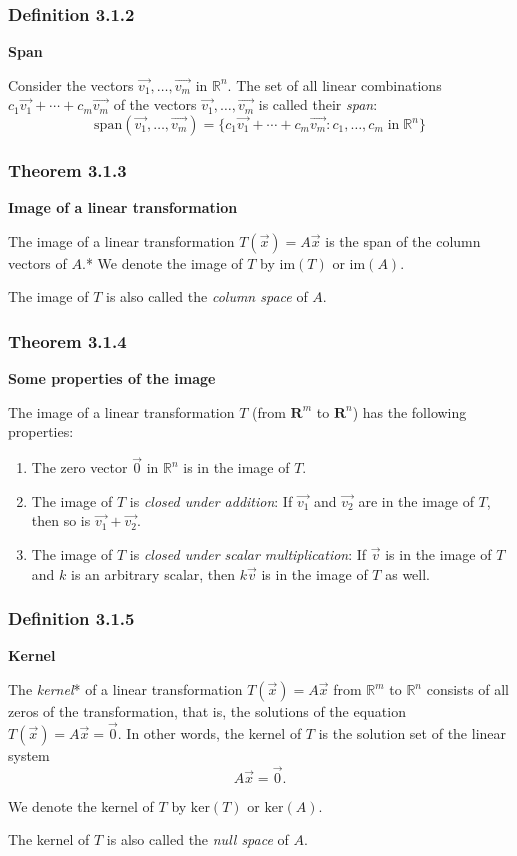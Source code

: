 \documentclass{report}
\begin{document}
\subsubsection*{Definition 3.1.2}
\par\noindent\textbf{Span}
\par\noindent Consider the vectors $\vec{v_{1}},\ldots{},\vec{v_{m}}$ in $\mathbb{R}^{n}$. The set of all linear combinations $c_{1}\vec{v_{1}}+\cdots{}+c_{m}\vec{v_{m}}$ of the vectors $\vec{v_{1}},\ldots{},\vec{v_{m}}$ is called their \textit{span}:
\[\textrm{span}(\vec{v_{1}},\ldots{},\vec{v_{m}})=\{c_{1}\vec{v_{1}}+\cdots{}+c_{m}\vec{v_{m}}:c_{1},\ldots{},c_{m}\;\textrm{in}\;\mathbb{R}^{n}\}\]
\subsubsection*{Theorem 3.1.3}
\par\noindent\textbf{Image of a linear transformation}
\par\noindent The image of a linear transformation $T(\vec{x})=A\vec{x}$ is the span of the column vectors of $A$.* We denote the image of $T$ by $\textrm{im}(T)$ or $\textrm{im}(A)$.
\par\noindent *The image of $T$ is also called the \textit{column space} of $A$.
\subsubsection*{Theorem 3.1.4}
\par\noindent\textbf{Some properties of the image}
\par\noindent The image of a linear transformation $T$ (from $\textbf{R}^{m}$ to $\textbf{R}^{n}$) has the following properties:
\renewcommand{\labelenumi}{\textbf{\alph{enumi}.}}
\begin{enumerate}
\item The zero vector $\vec{0}$ in $\mathbb{R}^{n}$ is in the image of $T$.
\item The image of $T$ is \textit{closed under addition}: If $\vec{v_{1}}$ and $\vec{v_{2}}$ are in the image of $T$, then so is $\vec{v_{1}}+\vec{v_{2}}$.
\item The image of $T$ is \textit{closed under scalar multiplication}: If $\vec{v}$ is in the image of $T$ and $k$ is an arbitrary scalar, then $k\vec{v}$ is in the image of $T$ as well.
\end{enumerate}
\subsubsection*{Definition 3.1.5}
\par\noindent\textbf{Kernel}
\par\noindent The \textit{kernel}* of a linear transformation $T(\vec{x})=A\vec{x}$ from $\mathbb{R}^{m}$ to $\mathbb{R}^{n}$ consists of all zeros of the transformation, that is, the solutions of the equation $T(\vec{x})=A\vec{x}=\vec{0}$. In other words, the kernel of $T$ is the solution set of the linear system
\[A\vec{x}=\vec{0}.\]
\par\noindent We denote the kernel of $T$ by $\textrm{ker}(T)$ or $\textrm{ker}(A)$.
\par\noindent *The kernel of $T$ is also called the \textit{null space} of $A$.
\end{document}
